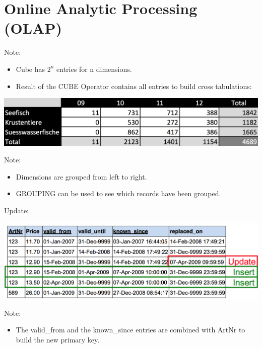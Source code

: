 
\section{Online Analytic Processing (OLAP)}


\begin{breakbox}
Note:
\begin{itemize}
	\item Cube has $2^n$ entries for n dimensions.
	\item Result of the CUBE Operator contains all entries to build cross tabulations:
\end{itemize}
\begin{center}
\includegraphics[width=.15\textwidth]{slides_images/cross_tabulation}
\end{center}
\end{breakbox}

\begin{breakbox}
Note:
\begin{itemize}
	\item Dimensions are grouped from left to right.
	\item GROUPING can be used to see which records have been grouped.
\end{itemize}
\end{breakbox}

\begin{breakbox}
\newline Update:
\begin{center}
\includegraphics[width=.15\textwidth]{slides_images/bi_temporal_update}
\end{center}
Note:
\begin{itemize}
	\item The valid\_from and the known\_since entries are combined with ArtNr to build the new primary key.
\end{itemize}
\end{breakbox}

